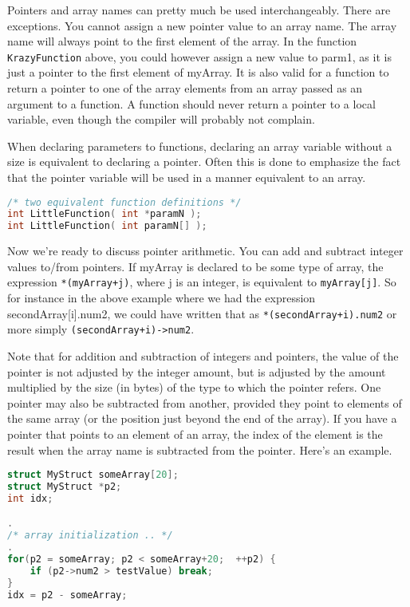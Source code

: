 Pointers and array names can pretty much be used interchangeably. There are
exceptions. You cannot assign a new pointer value to an array name. The array
name will always point to the first element of the array. In the function
\texttt{KrazyFunction} above, you could however assign a new value to parm1, as
it is just a pointer to the first element of myArray. It is also valid for a
function to return a pointer to one of the array elements from an array passed
as an argument to a function. A function should never return a pointer to a
local variable, even though the compiler will probably not complain.

When declaring parameters to functions, declaring an array variable without a
size is equivalent to declaring a pointer. Often this is done to emphasize the
fact that the pointer variable will be used in a manner equivalent to an array. 
\lstset{basicstyle=\scriptsize, numbers=left, captionpos=b, tabsize=4}
\begin{lstlisting}[caption=Section \thesection listing \arabic{pntcnt},language={C},
breaklines=true,xleftmargin=15pt,label=lst:section\thesection listing\arabic{pntcnt}]
/* two equivalent function definitions */
int LittleFunction( int *paramN );
int LittleFunction( int paramN[] );
\end{lstlisting}

Now we're ready to discuss pointer arithmetic. You can add and subtract integer
values to/from pointers. If myArray is declared to be some type of array, the
expression \texttt{*(myArray+j)}, where j is an integer, is equivalent to
\texttt{myArray[j]}. So for instance in the above example where we had the
expression secondArray[i].num2, we could have written that as
\texttt{*(secondArray+i).num2} or more simply
\texttt{(secondArray+i)-\textgreater{}num2}.

Note that for addition and subtraction of integers and pointers, the value of
the pointer is not adjusted by the integer amount, but is adjusted by the
amount multiplied by the size (in bytes) of the type to which the pointer
refers. One pointer may also be subtracted from another, provided they point to
elements of the same array (or the position just beyond the end of the array).
If you have a pointer that points to an element of an array, the index of the
element is the result when the array name is subtracted from the pointer.
Here's an example.
\lstset{basicstyle=\scriptsize, numbers=left, captionpos=b, tabsize=4}
\begin{lstlisting}[caption=Section \thesection listing \arabic{pntcnt},language={C},
breaklines=true,xleftmargin=15pt,label=lst:section\thesection listing\arabic{pntcnt}]
struct MyStruct someArray[20];
struct MyStruct *p2;
int idx;

.
/* array initialization .. */
. 
for(p2 = someArray; p2 < someArray+20;  ++p2) {
	if (p2->num2 > testValue) break;
}
idx = p2 - someArray;
\end{lstlisting}

